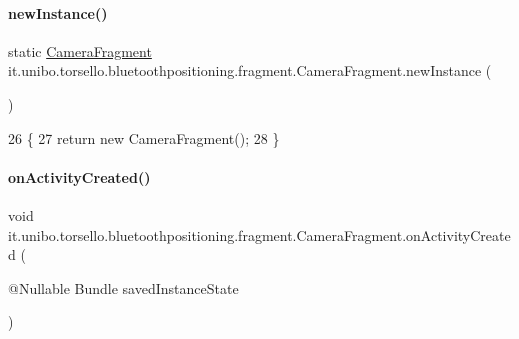 \paragraph{\texorpdfstring{new\+Instance()}{newInstance()}}
{\footnotesize\ttfamily static \hyperlink{classit_1_1unibo_1_1torsello_1_1bluetoothpositioning_1_1fragment_1_1CameraFragment}{Camera\+Fragment} it.\+unibo.\+torsello.\+bluetoothpositioning.\+fragment.\+Camera\+Fragment.\+new\+Instance (\begin{DoxyParamCaption}{ }\end{DoxyParamCaption})\hspace{0.3cm}{\ttfamily [static]}}


\begin{DoxyCode}
26                                                \{
27         \textcolor{keywordflow}{return} \textcolor{keyword}{new} CameraFragment();
28     \}
\end{DoxyCode}
\hypertarget{classit_1_1unibo_1_1torsello_1_1bluetoothpositioning_1_1fragment_1_1CameraFragment_a3af6cb206d2194e7d580cf511a97d6f1_a3af6cb206d2194e7d580cf511a97d6f1}{}\label{classit_1_1unibo_1_1torsello_1_1bluetoothpositioning_1_1fragment_1_1CameraFragment_a3af6cb206d2194e7d580cf511a97d6f1_a3af6cb206d2194e7d580cf511a97d6f1} 
\paragraph{\texorpdfstring{on\+Activity\+Created()}{onActivityCreated()}}
{\footnotesize\ttfamily void it.\+unibo.\+torsello.\+bluetoothpositioning.\+fragment.\+Camera\+Fragment.\+on\+Activity\+Created (\begin{DoxyParamCaption}\item[{@Nullable Bundle}]{saved\+Instance\+State }\end{DoxyParamCaption})}


